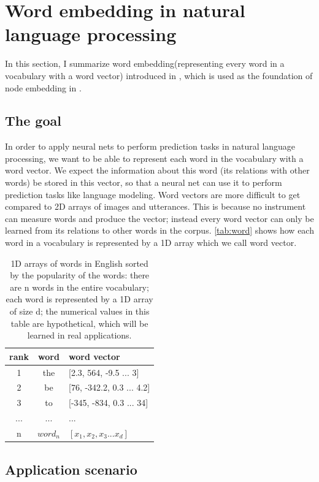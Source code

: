 \documentclass{article}
\begin{document}
\section{Word embedding in natural language processing}
In this section, I summarize word embedding(representing every word in a vocabulary with a word vector) introduced in \cite{mikolov2013efficient}, which is used as the foundation of node embedding in \cite{perozzi2014deepwalk}.

\subsection{The goal}

In order to apply neural nets to perform prediction tasks in natural language processing, we want to be able to represent each word in the vocabulary with a word vector. We expect the information about this word (its relations with other words) be stored in this vector, so that a neural net can use it to perform prediction tasks like language modeling. Word vectors are more difficult to get compared to 2D arrays of images and utterances. This is because no instrument can measure words and produce the vector; instead every word vector can only be learned from its relations to other words in the corpus. \autoref{tab:word} shows how each word in a vocabulary is represented by a 1D array which we call word vector.

\begin{table}[h]
	\centering
	\begin{tabularx}{0.5\textwidth}{|c|c|X|} \hline
		rank & word & word vector \\ \hline
		1 & the & [2.3, 564, -9.5 ... 3] \\ \hline
		2 & be & [76, -342.2, 0.3 ... 4.2] \\ \hline
		3 & to & [-345, -834, 0.3 ... 34] \\ \hline
		... & ... & ... \\ \hline
		n & $ word_n $ & $ [x_1, x_2, x_3 ... x_d] $ \\ \hline
	\end{tabularx}
	\caption{1D arrays of words in English sorted by the popularity of the words: there are n words in the entire vocabulary; each word is represented by a 1D array of size d; the numerical values in this table are hypothetical, which will be learned in real applications.}
	\label{tab:word}
\end{table}

\subsection{Application scenario}
\end{document}
